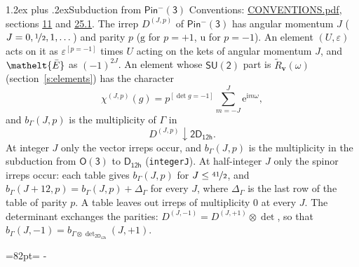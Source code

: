 \documentclass[10pt,a4paper]{article}
\makeatletter
\renewcommand\section{\@startsection{section}{1}{\z@}{-3ex plus -1ex minus -.2ex}%
  {1.2ex plus .2ex}{\normalfont\large\sffamily\bfseries\color{parttitle}}}
\newcommand{\needspace}[1]{\par\penalty-100\begingroup\dimen0=#1\relax\dimen2=\pagegoal
  \advance\dimen2-\pagetotal\ifdim\dimen0>\dimen2\relax\ifdim\dimen2>0pt\vfil\break\fi\fi
  \endgroup}
\numberwithin{equation}{section}
\newcommand{\eltfont}[1]{{\let\sigma\eltsigma\mathelt{#1}}}
\newcommand{\grp}[1]{\mathsf{#1}}
\newcommand{\elt}[1]{\eltfont{#1}}
\newcommand{\ptag}[1]{\mathrm{#1}}
\newcommand{\iverson}[1]{[#1]}
\newcommand{\restr}[2]{#1\!\downarrow#2}
\newcommand{\vv}{\mathbf{v}}
\newcommand{\iunit}{\mathrm{i}}
\newcommand{\expe}{\mathrm{e}}
\newcommand{\irrJp}[2]{D^{(#1,#2)}}
\newcommand{\irrprod}{\otimes}
\newcommand{\barred}[1]{\bar{#1}}
\newcommand{\lift}[1]{\tilde{#1}}
\makeatother
\begin{document}
\section{Subduction from \texorpdfstring{$\grp{Pin^{-}(3)}$}{Pin(3)}}\label{s:subduction_parent}
Conventions: \href{../../CONVENTIONS.pdf}{CONVENTIONS.pdf}, sections \href{../../../rotation/CONVENTIONS.pdf\#conv.11}{11} and \href{../../CONVENTIONS.pdf\#conv.25.1}{25.1}.
\leavevmode\label{n:index.J}\label{n:index.parity}\label{n:irrep.o3}The irrep $\irrJp{J}{p}$ of \href{Pinminus3.pdf}{$\grp{Pin^{-}(3)}$} has angular momentum $J$ ($J = 0, \nicefrac{1}{2}, 1, \dots$) and parity $p$ ($\ptag{g}$ for $p = +1$, $\ptag{u}$ for $p = -1$). An element $(U, \varepsilon)$ acts on it as $\varepsilon^{[p = -1]}$ times $U$ acting on the kets of angular momentum $J$, and $\elt{\barred{E}}$ as $(-1)^{2J}$. \label{n:function.character.parent}\label{n:function.multiplicity}An element whose $\grp{SU(2)}$ part is $\lift{R}_{\vv}(\omega)$ (section~\ref{s:elements}) has the character
\begin{equation}\label{e:chi}\chi^{(J,p)}(g) = p^{\iverson{\det g = -1}}\sum_{m=-J}^{J} \expe^{\iunit m\omega},\end{equation}
and $b_\Gamma(J, p)$ is the multiplicity of $\Gamma$ in
\begin{equation}\label{e:parent}\restr{\irrJp{J}{p}}{\grp{2D_{12h}}}.\end{equation}
At integer $J$ only the vector irreps occur, and $b_\Gamma(J, p)$ is the multiplicity in the subduction from $\grp{O(3)}$ to \href{../../../rotation/data/pdf/D12h.pdf}{$\grp{D_{12h}}$} (\texttt{integerJ}). \label{n:index.increment}At half-integer $J$ only the spinor irreps occur: each table gives $b_\Gamma(J, p)$ for $J \le \nicefrac{41}{2}$, and $b_\Gamma(J + 12, p) = b_\Gamma(J, p) + \Delta_\Gamma$ for every $J$, where $\Delta_\Gamma$ is the last row of the table of parity $p$. A table leaves out irreps of multiplicity 0 at every $J$.
\leavevmode\label{n:operator.determinant.character}The determinant exchanges the parities: $\irrJp{J}{-1} = \irrJp{J}{+1} \irrprod \det$, so that $b_\Gamma(J, -1) = b_{\Gamma \irrprod \det_{\grp{2D_{12h}}}}(J, +1)$.
\needspace{82pt}
\end{document}
